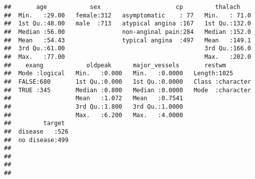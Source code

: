 \documentclass[
]{article}
\newenvironment{Shaded}{\begin{snugshade}}{\end{snugshade}}
\newcommand{\DecValTok}[1]{\textcolor[rgb]{0.00,0.00,0.81}{#1}}
\newcommand{\FunctionTok}[1]{\textcolor[rgb]{0.00,0.00,0.00}{#1}}
\newcommand{\NormalTok}[1]{#1}
\newcommand{\OtherTok}[1]{\textcolor[rgb]{0.56,0.35,0.01}{#1}}
\newcommand{\SpecialCharTok}[1]{\textcolor[rgb]{0.00,0.00,0.00}{#1}}
\begin{document}
\begin{Shaded}
\end{Shaded}

\begin{verbatim}
##       age            sex                     cp         thalach     
##  Min.   :29.00   female:312   asymptomatic    : 77   Min.   : 71.0  
##  1st Qu.:48.00   male  :713   atypical angina :167   1st Qu.:132.0  
##  Median :56.00                non-anginal pain:284   Median :152.0  
##  Mean   :54.43                typical angina  :497   Mean   :149.1  
##  3rd Qu.:61.00                                       3rd Qu.:166.0  
##  Max.   :77.00                                       Max.   :202.0  
##    exang            oldpeak      major_vessels       restwm         
##  Mode :logical   Min.   :0.000   Min.   :0.0000   Length:1025       
##  FALSE:680       1st Qu.:0.000   1st Qu.:0.0000   Class :character  
##  TRUE :345       Median :0.800   Median :0.0000   Mode  :character  
##                  Mean   :1.072   Mean   :0.7541                     
##                  3rd Qu.:1.800   3rd Qu.:1.0000                     
##                  Max.   :6.200   Max.   :4.0000                     
##         target   
##  disease   :526  
##  no disease:499  
##                  
##                  
##                  
## 
\end{verbatim}
\end{document}
